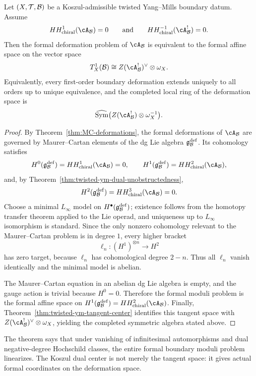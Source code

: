 \begin{theorem}
Let $(X,\mathcal{T},\mathcal{B})$ be a Koszul-admissible twisted Yang--Mills boundary datum. Assume
\[
HH^{1}_{\mathrm{chiral}}(\cA_{\cB}) = 0
\qquad\text{and}\qquad
HH^{-1}_{\mathrm{chiral}}(\cA_{\cB}^{!}) = 0.
\]
Then the formal deformation problem of $\cA_{\cB}$ is equivalent to the formal affine space on the vector space
\[
T^1_X(\cB)
\cong
Z(\cA_{\cB}^{!})^{\vee}\otimes \omega_X.
\]
Equivalently, every first-order boundary deformation extends uniquely to all orders up to unique equivalence, and the completed local ring of the deformation space is
\[
\widehat{\mathrm{Sym}}\bigl(Z(\cA_{\cB}^{!})\otimes \omega_X^{-1}\bigr).
\]
\end{theorem}

\begin{proof}
By Theorem~\ref{thm:MC-deformations}, the formal deformations of $\cA_{\cB}$ are governed by Maurer--Cartan elements of the dg Lie algebra $\mathfrak{g}^{\mathrm{def}}_{\mathcal{B}}$. Its cohomology satisfies
\[
H^0(\mathfrak{g}^{\mathrm{def}}_{\cB}) = HH^{1}_{\mathrm{chiral}}(\cA_{\cB}) = 0,
\qquad
H^1(\mathfrak{g}^{\mathrm{def}}_{\cB}) = HH^{2}_{\mathrm{chiral}}(\cA_{\cB}),
\]
and, by Theorem~\ref{thm:twisted-ym-dual-unobstructedness},
\[
H^2(\mathfrak{g}^{\mathrm{def}}_{\cB}) = HH^{3}_{\mathrm{chiral}}(\cA_{\cB}) = 0.
\]
Choose a minimal $L_\infty$ model on $H^\bullet(\mathfrak{g}^{\mathrm{def}}_{\mathcal{B}})$; existence follows from the homotopy transfer theorem applied to the Lie operad, and uniqueness up to $L_\infty$ isomorphism is standard. Since the only nonzero cohomology relevant to the Maurer--Cartan problem is in degree $1$, every higher bracket
\[
\ell_n \colon (H^1)^{\otimes n} \longrightarrow H^{2}
\]
has zero target, because $\ell_n$ has cohomological degree $2-n$. Thus all $\ell_n$ vanish identically and the minimal model is abelian.

The Maurer--Cartan equation in an abelian dg Lie algebra is empty, and the gauge action is trivial because $H^0=0$. Therefore the formal moduli problem is the formal affine space on $H^1(\mathfrak{g}^{\mathrm{def}}_{\cB}) = HH^2_{\mathrm{chiral}}(\cA_{\cB})$. Finally, Theorem~\ref{thm:twisted-ym-tangent-center} identifies this tangent space with $Z(\cA_{\cB}^{!})^{\vee}\otimes\omega_X$, yielding the completed symmetric algebra stated above.
\end{proof}

\begin{remark}[Interpretation]
The theorem says that under vanishing of infinitesimal automorphisms and dual negative-degree Hochschild classes, the entire formal boundary moduli problem linearizes. The Koszul dual center is not merely the tangent space: it gives actual formal coordinates on the deformation space.
\end{remark}

